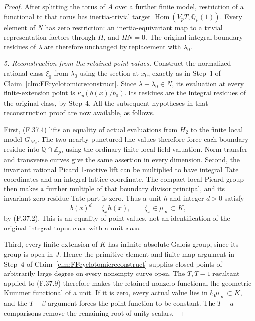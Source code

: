 \documentclass[11pt]{article}
\begin{document}
\begin{proof}
After splitting the torus of \(A\)
over a further finite model, restriction
of a functional to that torus has
inertia-trivial target
\(\operatorname{Hom}(V_pT,\mathbb Q_p(1))\).
Every element of \(N\) has zero
restriction: an inertia-equivariant
map to a trivial representation
factors through \(\Pi\), and
\(\Pi N=0\). The original integral
boundary residues of \(\lambda\)
are therefore unchanged by replacement
with \(\lambda_0\).

\emph{5. Reconstruction from the retained point values.}
Construct the normalized rational
class \(\xi_0\) from \(\lambda_0\)
using the section at \(x_0\),
exactly as in Step~1 of
Claim~\ref{clm:FFcyclotomicreconstruct}.
Since \(\lambda-\lambda_0\in N\),
its evaluation at every finite-extension
point is \(\kappa_p(b(x)/b_0)\).
Its residues are the integral residues
of the original class, by Step~4.
All the subsequent hypotheses in
that reconstruction proof are now
available, as follows.

First, (F.37.4) lifts an equality
of actual evaluations from \(H_2\)
to the finite local model \(G_{M_2}\).
The two nearby punctured-line values
therefore force each boundary residue
into \(\mathbb Q\cap\mathbb Z_p\),
using the ordinary finite-local-field
valuation. Norm transfer and transverse
curves give the same assertion in
every dimension. Second, the invariant
rational Picard 1-motive lift can
be multiplied to have integral Tate
coordinates and an integral lattice
coordinate. The compact local Picard
group then makes a further multiple
of that boundary divisor principal,
and its invariant zero-residue Tate
part is zero. Thus a unit \(h\)
and integer \(d>0\) satisfy
\[
                    b(x)^d=\zeta_xh(x),
                         \qquad\zeta_x\in\mu_\infty\subset K,
                                                        \tag{F.37.9}
\]
by (F.37.2). This is an equality
of point values, not an identification
of the original integral topos class
with a unit class.

Third, every finite extension of
\(K\) has infinite absolute Galois
group, since its group is open in
\(J\). Hence the primitive-element
and finite-map argument in Step~4
of Claim~\ref{clm:FFcyclotomicreconstruct}
supplies closed points of arbitrarily
large degree on every nonempty
curve open. The \(T,T-1\) resultant
applied to (F.37.9) therefore makes
the retained nonzero functional the
geometric Kummer functional of a unit.
If it is zero, every actual value
lies in \(b_0\mu_\infty\subset K\),
and the \(T-\beta\) argument forces
the point function to be constant.
The \(T-a\) comparisons remove the
remaining root-of-unity scalars.


\end{proof}
\end{document}

